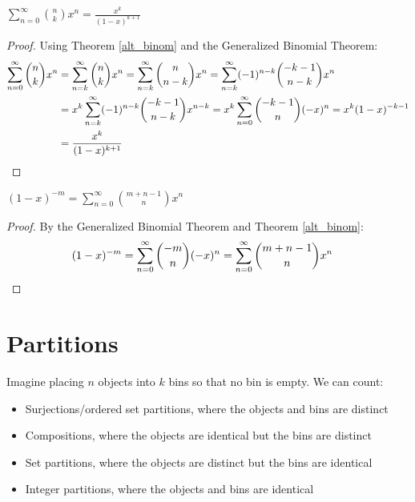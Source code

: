 \documentclass[a4paper]{article}
\begin{document}
\begin{theorem}\label{sum_bin_times_monom}
$\displaystyle\sum_{n=0}^\infty\binom nkx^n=\frac{x^k}{(1-x)^{k+1}}$

\begin{hl}
\begin{proof}
Using Theorem \ref{alt_binom} and the Generalized Binomial Theorem:
\begin{align*}
\sum_{n=0}^\infty\binom nkx^n
&= \sum_{n=k}^\infty\binom nkx^n
= \sum_{n=k}^\infty\binom n{n-k}x^n
= \sum_{n=k}^\infty(-1)^{n-k}\binom{-k-1}{n-k}x^n\\
&= x^k\sum_{n=k}^\infty(-1)^{n-k}\binom{-k-1}{n-k}x^{n-k}
= x^k\sum_{n=0}^\infty\binom{-k-1}{n}(-x)^{n}
= x^k(1-x)^{-k-1}\\
&=\frac{x^k}{(1-x)^{k+1}}\qedhere
\end{align*}
\end{proof}
\end{hl}
\end{theorem}

\begin{theorem}
$\displaystyle(1-x)^{-m}=\sum_{n=0}^\infty\binom{m+n-1}nx^n$

\begin{hl}
\begin{proof}
By the Generalized Binomial Theorem and Theorem \ref{alt_binom}:
\begin{align*}
(1-x)^{-m}
&=\sum_{n=0}^\infty\binom{-m}n(-x)^n
=\sum_{n=0}^\infty\binom{m+n-1}nx^n\qedhere
\end{align*}
\end{proof}
\end{hl}
\end{theorem}


\section{Partitions}

\begin{concept}
Imagine placing $n$ objects into $k$ bins so that no bin is empty. We can count:
\begin{itemize}
\item Surjections/ordered set partitions, where the objects and bins are distinct
\item Compositions, where the objects are identical but the bins are distinct
\item Set partitions, where the objects are distinct but the bins are identical
\item Integer partitions, where the objects and bins are identical
\end{itemize}
\end{concept}
\end{document}
